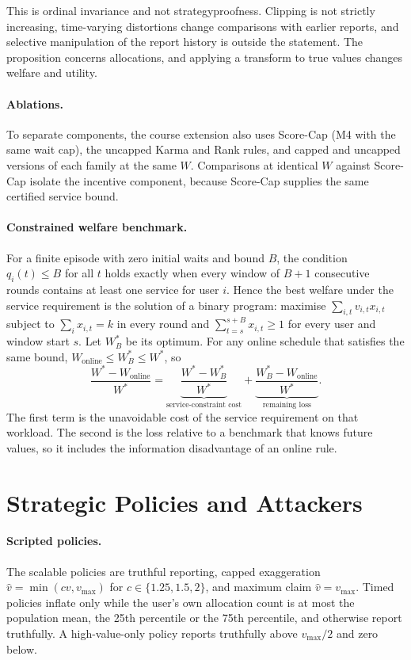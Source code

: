 \documentclass{article}
\theoremstyle{plain}
\theoremstyle{definition}
\newcommand{\vmax}{v_{\max}}
\begin{document}
This is ordinal invariance and not strategyproofness.
Clipping is not strictly increasing, time-varying distortions change comparisons with earlier reports, and selective manipulation of the report history is outside the statement.
The proposition concerns allocations, and applying a transform to true values changes welfare and utility.

\paragraph{Ablations.}
To separate components, the course extension also uses Score-Cap (M4 with the same wait cap), the uncapped Karma and Rank rules, and capped and uncapped versions of each family at the same $W$.
Comparisons at identical $W$ against Score-Cap isolate the incentive component, because Score-Cap supplies the same certified service bound.

\paragraph{Constrained welfare benchmark.}
For a finite episode with zero initial waits and bound $B$, the condition $q_i(t)\le B$ for all $t$ holds exactly when every window of $B+1$ consecutive rounds contains at least one service for user $i$.
Hence the best welfare under the service requirement is the solution of a binary program: maximise $\sum_{i,t}v_{i,t}x_{i,t}$ subject to $\sum_i x_{i,t}=k$ in every round and $\sum_{t=s}^{s+B}x_{i,t}\ge 1$ for every user and window start $s$.
Let $W^*_B$ be its optimum.
For any online schedule that satisfies the same bound, $W_{\text{online}}\le W^*_B\le W^*$, so
\begin{equation}
\frac{W^*-W_{\text{online}}}{W^*}=\underbrace{\frac{W^*-W^*_B}{W^*}}_{\text{service-constraint cost}}+\underbrace{\frac{W^*_B-W_{\text{online}}}{W^*}}_{\text{remaining loss}}.
\end{equation}
The first term is the unavoidable cost of the service requirement on that workload.
The second is the loss relative to a benchmark that knows future values, so it includes the information disadvantage of an online rule.

\section{Strategic Policies and Attackers}
\label{sec:attackers}

\paragraph{Scripted policies.}
The scalable policies are truthful reporting, capped exaggeration $\hat v=\min(cv,\vmax)$ for $c\in\{1.25,1.5,2\}$, and maximum claim $\hat v=\vmax$.
Timed policies inflate only while the user's own allocation count is at most the population mean, the 25th percentile or the 75th percentile, and otherwise report truthfully.
A high-value-only policy reports truthfully above $\vmax/2$ and zero below.
\end{document}
